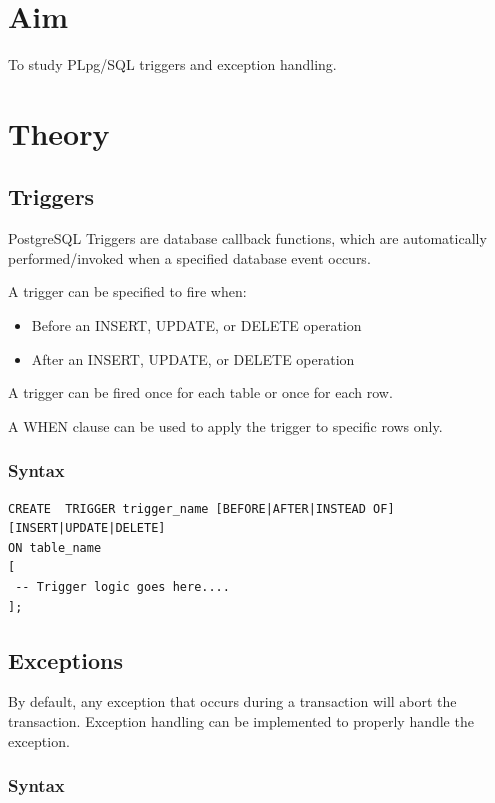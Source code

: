 \section{Aim}
 To study PLpg/SQL triggers and exception handling.

\section{{Theory}}

\subsection{Triggers}

PostgreSQL Triggers are database callback functions, which are automatically performed/invoked when a specified database event occurs.

A trigger can be specified to fire when:
\begin{itemize}
	\item Before an INSERT, UPDATE, or DELETE operation
	\item After an INSERT, UPDATE, or DELETE operation
\end{itemize}

A trigger can be fired once for each table or once for each row.

A WHEN clause can be used to apply the trigger to specific rows only.

\subsubsection{Syntax}

\begin{verbatim}
CREATE  TRIGGER trigger_name [BEFORE|AFTER|INSTEAD OF] [INSERT|UPDATE|DELETE]
ON table_name
[
 -- Trigger logic goes here....
];
\end{verbatim}

\subsection{Exceptions}

By default, any exception that occurs during a transaction will abort the transaction. Exception handling can be implemented to properly handle the exception.

\subsubsection{Syntax}

